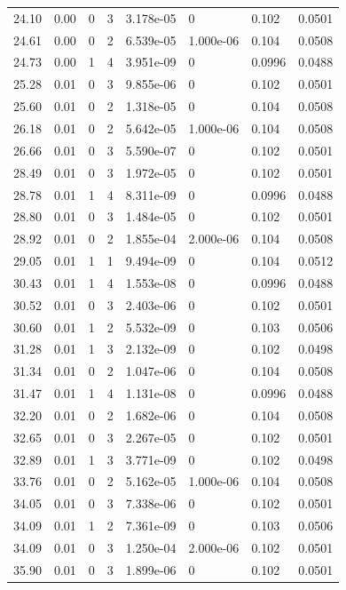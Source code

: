 \documentclass[preview]{standalone}
\begin{document}
{{{\begin{tabular}{L{1.2cm}C{1.2cm} C{0.3cm}C{0.5cm} C{1.4cm}C{1.4cm} C{1.4cm}C{1.4cm}}
  24.10  &  0.00  & 0     &  3 &  3.178e-05  & 0  & 0.102 &  0.0501   \\ 
  24.61  &  0.00  & 0     &  2 &  6.539e-05  & 1.000e-06  & 0.104 &  0.0508   \\ 
  24.73  &  0.00  & 1     &  4 &  3.951e-09  & 0  & 0.0996 &  0.0488   \\ 
  25.28  &  0.01  & 0     &  3 &  9.855e-06  & 0  & 0.102 &  0.0501   \\ 
  25.60  &  0.01  & 0     &  2 &  1.318e-05  & 0  & 0.104 &  0.0508   \\ 
  26.18  &  0.01  & 0     &  2 &  5.642e-05  & 1.000e-06  & 0.104 &  0.0508   \\ 
  26.66  &  0.01  & 0     &  3 &  5.590e-07  & 0  & 0.102 &  0.0501   \\ 
  28.49  &  0.01  & 0     &  3 &  1.972e-05  & 0  & 0.102 &  0.0501   \\ 
  28.78  &  0.01  & 1     &  4 &  8.311e-09  & 0  & 0.0996 &  0.0488   \\ 
  28.80  &  0.01  & 0     &  3 &  1.484e-05  & 0  & 0.102 &  0.0501   \\ 
  28.92  &  0.01  & 0     &  2 &  1.855e-04  & 2.000e-06  & 0.104 &  0.0508   \\ 
  29.05  &  0.01  & 1     &  1 &  9.494e-09  & 0  & 0.104 &  0.0512   \\ 
  30.43  &  0.01  & 1     &  4 &  1.553e-08  & 0  & 0.0996 &  0.0488   \\ 
  30.52  &  0.01  & 0     &  3 &  2.403e-06  & 0  & 0.102 &  0.0501   \\ 
  30.60  &  0.01  & 1     &  2 &  5.532e-09  & 0  & 0.103 &  0.0506   \\ 
  31.28  &  0.01  & 1     &  3 &  2.132e-09  & 0  & 0.102 &  0.0498   \\ 
  31.34  &  0.01  & 0     &  2 &  1.047e-06  & 0  & 0.104 &  0.0508   \\ 
  31.47  &  0.01  & 1     &  4 &  1.131e-08  & 0  & 0.0996 &  0.0488   \\ 
  32.20  &  0.01  & 0     &  2 &  1.682e-06  & 0  & 0.104 &  0.0508   \\ 
  32.65  &  0.01  & 0     &  3 &  2.267e-05  & 0  & 0.102 &  0.0501   \\ 
  32.89  &  0.01  & 1     &  3 &  3.771e-09  & 0  & 0.102 &  0.0498   \\ 
  33.76  &  0.01  & 0     &  2 &  5.162e-05  & 1.000e-06  & 0.104 &  0.0508   \\ 
  34.05  &  0.01  & 0     &  3 &  7.338e-06  & 0  & 0.102 &  0.0501   \\ 
  34.09  &  0.01  & 1     &  2 &  7.361e-09  & 0  & 0.103 &  0.0506   \\ 
  34.09  &  0.01  & 0     &  3 &  1.250e-04  & 2.000e-06  & 0.102 &  0.0501   \\ 
  35.90  &  0.01  & 0     &  3 &  1.899e-06  & 0  & 0.102 &  0.0501   \\ 
\hline 
\end{tabular} 

}}}
\end{document}

